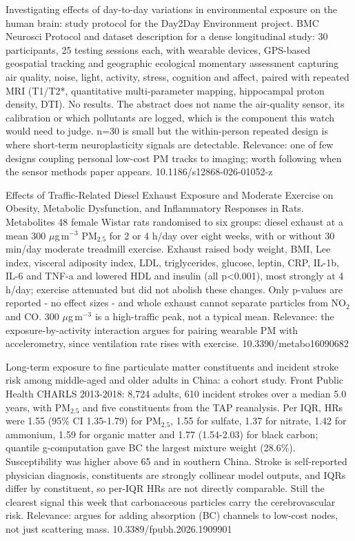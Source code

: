 \documentclass[10pt]{article}
\begin{document}
{Investigating effects of day-to-day variations in environmental exposure on the human brain: study protocol for the Day2Day Environment project.}
{BMC Neurosci}
{Protocol and dataset description for a dense longitudinal study: 30 participants, 25 testing sessions each, with wearable devices, GPS-based geospatial tracking and geographic ecological momentary assessment capturing air quality, noise, light, activity, stress, cognition and affect, paired with repeated MRI (T1/T2*, quantitative multi-parameter mapping, hippocampal proton density, DTI). No results. The abstract does not name the air-quality sensor, its calibration or which pollutants are logged, which is the component this watch would need to judge. n=30 is small but the within-person repeated design is where short-term neuroplasticity signals are detectable. Relevance: one of few designs coupling personal low-cost PM tracks to imaging; worth following when the sensor methods paper appears.}
{10.1186/s12868-026-01052-z}


{Effects of Traffic-Related Diesel Exhaust Exposure and Moderate Exercise on Obesity, Metabolic Dysfunction, and Inflammatory Responses in Rats.}
{Metabolites}
{48 female Wistar rats randomised to six groups: diesel exhaust at a mean 300 $\mu$g\,m$^{-3}$ PM$_{2.5}$ for 2 or 4 h/day over eight weeks, with or without 30 min/day moderate treadmill exercise. Exhaust raised body weight, BMI, Lee index, visceral adiposity index, LDL, triglycerides, glucose, leptin, CRP, IL-1b, IL-6 and TNF-a and lowered HDL and insulin (all p<0.001), most strongly at 4 h/day; exercise attenuated but did not abolish these changes. Only p-values are reported - no effect sizes - and whole exhaust cannot separate particles from NO$_2$ and CO. 300 $\mu$g\,m$^{-3}$ is a high-traffic peak, not a typical mean. Relevance: the exposure-by-activity interaction argues for pairing wearable PM with accelerometry, since ventilation rate rises with exercise.}
{10.3390/metabo16090682}

{Long-term exposure to fine particulate matter constituents and incident stroke risk among middle-aged and older adults in China: a cohort study.}
{Front Public Health}
{CHARLS 2013-2018: 8,724 adults, 610 incident strokes over a median 5.0 years, with PM$_{2.5}$ and five constituents from the TAP reanalysis. Per IQR, HRs were 1.55 (95\% CI 1.35-1.79) for PM$_{2.5}$, 1.55 for sulfate, 1.37 for nitrate, 1.42 for ammonium, 1.59 for organic matter and 1.77 (1.54-2.03) for black carbon; quantile g-computation gave BC the largest mixture weight (28.6\%). Susceptibility was higher above 65 and in southern China. Stroke is self-reported physician diagnosis, constituents are strongly collinear model outputs, and IQRs differ by constituent, so per-IQR HRs are not directly comparable. Still the clearest signal this week that carbonaceous particles carry the cerebrovascular risk. Relevance: argues for adding absorption (BC) channels to low-cost nodes, not just scattering mass.}
{10.3389/fpubh.2026.1909901}
\end{document}
